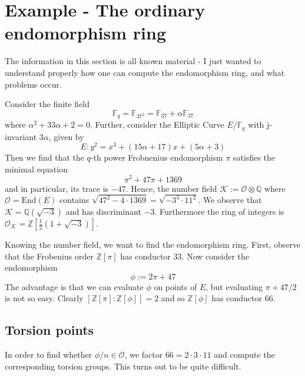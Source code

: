 \documentclass{scrartcl}
\newcommand{\Z}{\mathbb{Z}}
\newcommand{\F}{\mathbb{F}}
\newcommand{\End}{\mathrm{End}}
\newcommand{\K}{\mathcal{K}}
\renewcommand{\O}{\mathcal{O}}
\theoremstyle{definition}
\begin{document}
\section{Example - The ordinary endomorphism ring}
The information in this section is all known material - I just wanted to understand properly how one can compute the endomorphism ring, and what problems occur.

Consider the finite field
\begin{equation*}
    \F_q = \F_{37^2} = \F_{37} + \alpha \F_{37}
\end{equation*}
where $\alpha^2 + 33\alpha + 2 = 0$.
Further, consider the Elliptic Curve $E/\F_q$ with j-invariant $3\alpha$, given by
\begin{equation*}
    E: y^2 = x^3 + (15\alpha + 17)x + (5\alpha + 3)
\end{equation*}
Then we find that the $q$-th power Frobnenius endomorphism $\pi$ satisfies the minimal equation
\begin{equation*}
    \pi^2 + 47 \pi + 1369
\end{equation*}
and in particular, its trace is $-47$.
Hence, the number field $\K := \O \otimes \mathbb{Q}$ where $\O = \End(E)$ contains $\sqrt{47^2 - 4 \cdot 1369} = \sqrt{-3^3 \cdot 11^2}$.
We observe that $\K = \mathbb{Q}(\sqrt{-3})$ and has discriminant $-3$.
Furthermore the ring of integers is $\O_\K = \Z[\frac 1 2(1 + \sqrt{-3})]$.

Knowing the number field, we want to find the endomorphism ring.
First, observe that the Frobenius order $\Z[\pi]$ has conductor 33.
Now consider the endomorphism
\begin{equation*}
    \phi := 2\pi + 47
\end{equation*}
The advantage is that we can evaluate $\phi$ on points of $E$, but evaluating $\pi + 47/2$ is not so easy.
Clearly $[\Z[\pi] : \Z[\phi]] = 2$ and so $\Z[\phi]$ has conductor 66.

\subsection*{Torsion points}
In order to find whether $\phi/n \in \O$, we factor $66 = 2 \cdot 3 \cdot 11$ and compute the corresponding torsion groups.
This turns out to be quite difficult.
\end{document}
